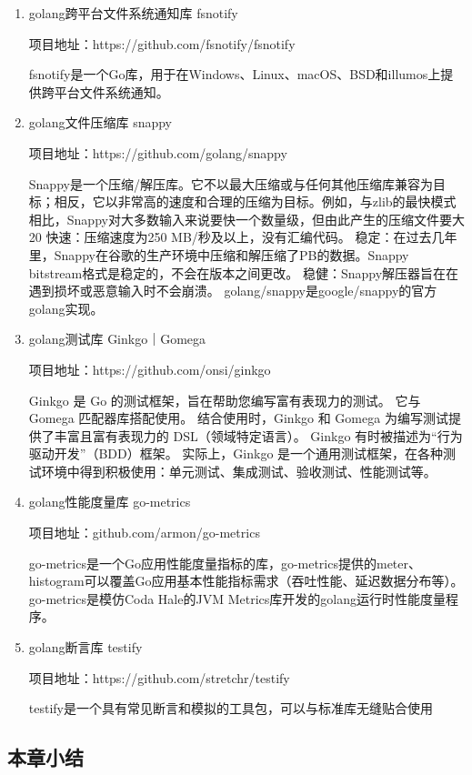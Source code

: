 	\begin{enumerate}[fullwidth,itemindent=2em,listparindent=2em]
	
		\item golang跨平台文件系统通知库 fsnotify
		
		项目地址：https://github.com/fsnotify/fsnotify

		fsnotify是一个Go库，用于在Windows、Linux、macOS、BSD和illumos上提供跨平台文件系统通知。

		\item golang文件压缩库 snappy
		
		项目地址：https://github.com/golang/snappy

		Snappy是一个压缩/解压库。它不以最大压缩或与任何其他压缩库兼容为目标；相反，它以非常高的速度和合理的压缩为目标。例如，与zlib的最快模式相比，Snappy对大多数输入来说要快一个数量级，但由此产生的压缩文件要大20%
		快速：压缩速度为250 MB/秒及以上，没有汇编代码。
		稳定：在过去几年里，Snappy在谷歌的生产环境中压缩和解压缩了PB的数据。Snappy bitstream格式是稳定的，不会在版本之间更改。
		稳健：Snappy解压器旨在在遇到损坏或恶意输入时不会崩溃。
		golang/snappy是google/snappy的官方golang实现。

		\item golang测试库 Ginkgo｜Gomega
		
		项目地址：https://github.com/onsi/ginkgo

		Ginkgo 是 Go 的测试框架，旨在帮助您编写富有表现力的测试。 它与 Gomega 匹配器库搭配使用。 结合使用时，Ginkgo 和 Gomega 为编写测试提供了丰富且富有表现力的 DSL（领域特定语言）。
		Ginkgo 有时被描述为“行为驱动开发”（BDD）框架。 实际上，Ginkgo 是一个通用测试框架，在各种测试环境中得到积极使用：单元测试、集成测试、验收测试、性能测试等。
		
		\item golang性能度量库 go-metrics
		
		项目地址：github.com/armon/go-metrics 
		
		go-metrics是一个Go应用性能度量指标的库，go-metrics提供的meter、histogram可以覆盖Go应用基本性能指标需求（吞吐性能、延迟数据分布等）。
		go-metrics是模仿Coda Hale的JVM Metrics库开发的golang运行时性能度量程序。
		
		
		\item golang断言库 testify
		
		项目地址：https://github.com/stretchr/testify

		testify是一个具有常见断言和模拟的工具包，可以与标准库无缝贴合使用
		

	\end{enumerate}
	
	\subsection{本章小结}
	
\clearpage